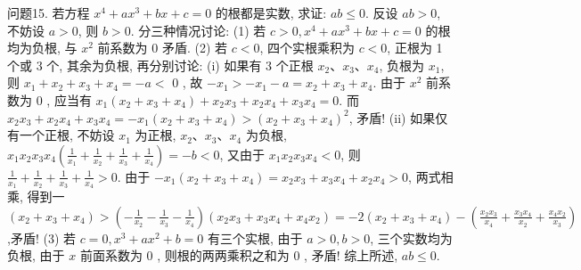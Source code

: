 问题15. 若方程 $x^4+a x^3+b x+c=0$ 的根都是实数, 求证: $a b \leqslant 0$.
反设 $a b>0$, 不妨设 $a>0$, 则 $b>0$. 分三种情况讨论:
(1) 若 $c>0, x^4+a x^3+b x+c=0$ 的根均为负根, 与 $x^2$ 前系数为 0 矛盾.
(2) 若 $c<0$, 四个实根乘积为 $c<0$, 正根为 1 个或 3 个, 其余为负根, 再分别讨论:
(i) 如果有 3 个正根 $x_2 、 x_3 、 x_4$, 负根为 $x_1$, 则 $x_1+x_2+x_3+x_4=-a<$ 0 , 故 $-x_1>-x_1-a=x_2+x_3+x_4$. 由于 $x^2$ 前系数为 0 , 应当有 $x_1\left(x_2+\right. \left.x_3+x_4\right)+x_2 x_3+x_2 x_4+x_3 x_4=0$.
而 $x_2 x_3+x_2 x_4+x_3 x_4=-x_1\left(x_2+x_3+x_4\right)>\left(x_2+x_3+x_4\right)^2$, 矛盾!
(ii) 如果仅有一个正根, 不妨设 $x_1$ 为正根, $x_2 、 x_3 、 x_4$ 为负根, $x_1 x_2 x_3 x_4\left(\frac{1}{x_1}+\frac{1}{x_2}+\frac{1}{x_3}+\frac{1}{x_4}\right)=-b<0$, 又由于 $x_1 x_2 x_3 x_4<0$, 则 $\frac{1}{x_1}+\frac{1}{x_2}+ \frac{1}{x_3}+\frac{1}{x_4}>0$. 由于 $-x_1\left(x_2+x_3+x_4\right)=x_2 x_3+x_3 x_4+x_2 x_4>0$, 两式相乘, 得到一 $\left(x_2+x_3+x_4\right)>\left(-\frac{1}{x_2}-\frac{1}{x_3}-\frac{1}{x_4}\right)\left(x_2 x_3+x_3 x_4+x_4 x_2\right)=-2\left(x_2+\right. \left.x_3+x_4\right)-\left(\frac{x_2 x_3}{x_4}+\frac{x_3 x_4}{x_2}+\frac{x_4 x_2}{x_3}\right)$,矛盾!
(3) 若 $c=0, x^3+a x^2+b=0$ 有三个实根, 由于 $a>0, b>0$, 三个实数均为负根, 由于 $x$ 前面系数为 0 , 则根的两两乘积之和为 0 , 矛盾!
综上所述, $a b \leqslant 0$.


